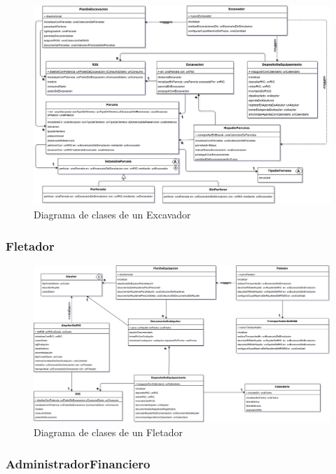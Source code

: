 \documentclass[10pt,a3paper, ,landscape]{article}
\begin{document}
\begin{figure}[H]
\centerline{\includegraphics[scale=0.7]{images/DiagramaDeClases_deExcavador.png}}
\caption{Diagrama de clases de un Excavador}
\end{figure}

\subsubsection{Fletador}

\begin{figure}[H]
\centerline{\includegraphics[scale=0.38]{images/DiagramaDeClases_deFletador.png}}
\caption{Diagrama de clases de un Fletador}
\end{figure}

\subsubsection{AdministradorFinanciero}
\end{document}
